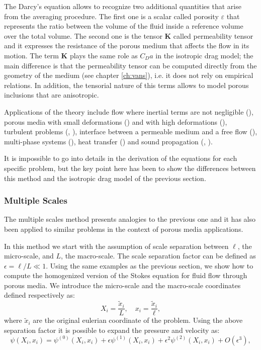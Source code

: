 The Darcy's equation allows to recognize two additional quantities that arise from the averaging procedure. The first one is a scalar called porosity $\varepsilon$ that represents the ratio between the volume of the fluid inside a reference volume over the total volume.
The second one is the tensor $\mathbf{K}$ called permeability tensor and it expresses the resistance of the porous medium that affects the flow in its motion.
The term $\mathbf{K}$ plays the same role as $C_D a$ in the isotropic drag model; the main difference is that the permeability tensor can be computed directly from the geometry of the medium (see chapter \ref{ch:vans}), i.e. it does not rely on empirical relations.
In addition, the tensorial nature of this terms allows to model porous inclusions that are anisotropic.

Applications of the theory include flow where inertial terms are not negligible (\citet{whitaker1996forchheimer}), porous media with small deformations (\citet{whitaker1986flow2}) and with high deformations (\citet{hussong2011continuum}), turbulent problems (\citet{soulaine2014}, \citet{breugem2006influence}), interface between a permeable medium and a free flow (\citet{beaver}), multi-phase systems (\citet{whitaker1973transport}), heat transfer (\citet{carbonell1984heat}) and sound propagation (\citet{firdaouss1998some}, \citet{lafarge1998sound}).

It is impossible to go into details in the derivation of the equations for each specific problem, but the key point here has been to show the differences between this method and the isotropic drag model of the previous section.

\subsubsection{Multiple Scales}

The multiple scales method presents analogies to the previous one and it has also been applied to similar problems in the context of porous media applications.

In this method we start with the assumption of scale separation between $\ell$, the micro-scale, and $L$, the macro-scale.
The scale separation factor can be defined as $\epsilon = \ell/L \ll 1$.
Using the same examples as the previous section, we show how to compute the homogenized version of the Stokes equation for fluid flow through porous media.
We introduce the micro-scale and the macro-scale coordinates defined respectively as:
$$
 X_i = \dfrac{\tilde{x}_i}{L}, \quad   x_i = \dfrac{\tilde{x}_i}{\ell},
$$
where $\tilde{x}_i$ are the original eulerian coordinate of the problem.
Using the above separation factor it is possible to expand the pressure and velocity as:
$$
\psi(X_i, x_i) = \psi^{(0)}(X_i, x_i)  +\epsilon \psi^{(1)}(X_i, x_i) +\epsilon^2 \psi^{(2)}(X_i, x_i) +O(\epsilon^3),
$$

